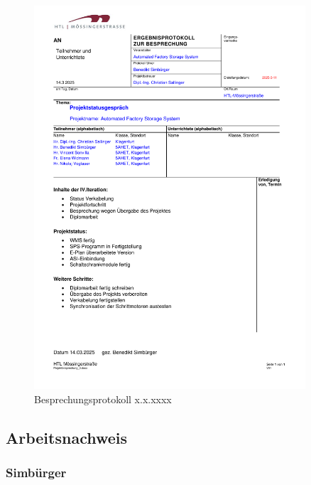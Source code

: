 \begin{figure}[H]
    \includegraphics[width=0.9\textwidth]{../Protokolls/Projektbesprechung_3.pdf}
    \centering
    \caption{Besprechungsprotokoll x.x.xxxx}
\end{figure}




\newpage
\subsection{Arbeitsnachweis}

\subsubsection{Simbürger}

